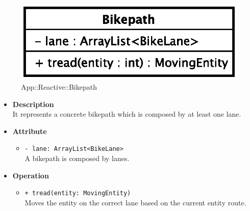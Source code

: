 \begin{figure}[h]
\centering
\includegraphics[scale=0.6,keepaspectratio]{images/solution/bikepath.eps}
\caption{App::Reactive::Bikepath}
\label{fig:sd-app-bikepath}
\end{figure}
\FloatBarrier
\begin{itemize}
  \item \textbf{Description} \\
    It represents a concrete bikepath which is composed by at least one lane.
  \item \textbf{Attribute}
  \begin{itemize}
    \item \texttt{- lane: ArrayList<BikeLane>} \\
A bikepath is composed by lanes.
  \end{itemize}
  \item \textbf{Operation}
  \begin{itemize} 
    \item \texttt{+ tread(entity: MovingEntity)} \\
Moves the entity on the correct lane based on the current entity route. 
  \end{itemize}
\end{itemize}
